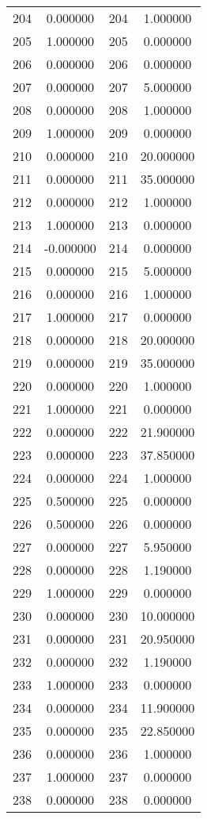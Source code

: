 \documentclass[12pt]{article}
\begin{document}
\begin{longtable}{@{}cccc@{}}
204 & 0.000000 & 204 & 1.000000 \\
205 & 1.000000 & 205 & 0.000000 \\
206 & 0.000000 & 206 & 0.000000 \\
207 & 0.000000 & 207 & 5.000000 \\
208 & 0.000000 & 208 & 1.000000 \\
209 & 1.000000 & 209 & 0.000000 \\
210 & 0.000000 & 210 & 20.000000 \\
211 & 0.000000 & 211 & 35.000000 \\
212 & 0.000000 & 212 & 1.000000 \\
213 & 1.000000 & 213 & 0.000000 \\
214 & -0.000000 & 214 & 0.000000 \\
215 & 0.000000 & 215 & 5.000000 \\
216 & 0.000000 & 216 & 1.000000 \\
217 & 1.000000 & 217 & 0.000000 \\
218 & 0.000000 & 218 & 20.000000 \\
219 & 0.000000 & 219 & 35.000000 \\
220 & 0.000000 & 220 & 1.000000 \\
221 & 1.000000 & 221 & 0.000000 \\
222 & 0.000000 & 222 & 21.900000 \\
223 & 0.000000 & 223 & 37.850000 \\
224 & 0.000000 & 224 & 1.000000 \\
225 & 0.500000 & 225 & 0.000000 \\
226 & 0.500000 & 226 & 0.000000 \\
227 & 0.000000 & 227 & 5.950000 \\
228 & 0.000000 & 228 & 1.190000 \\
229 & 1.000000 & 229 & 0.000000 \\
230 & 0.000000 & 230 & 10.000000 \\
231 & 0.000000 & 231 & 20.950000 \\
232 & 0.000000 & 232 & 1.190000 \\
233 & 1.000000 & 233 & 0.000000 \\
234 & 0.000000 & 234 & 11.900000 \\
235 & 0.000000 & 235 & 22.850000 \\
236 & 0.000000 & 236 & 1.000000 \\
237 & 1.000000 & 237 & 0.000000 \\
238 & 0.000000 & 238 & 0.000000 \\

\end{longtable}
\end{document}
